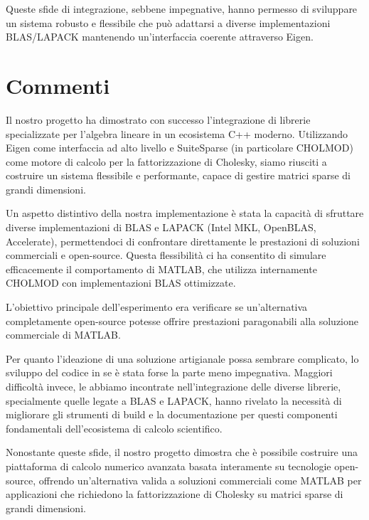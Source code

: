 Queste sfide di integrazione, sebbene impegnative, hanno permesso di sviluppare un sistema robusto e flessibile che può adattarsi a diverse implementazioni BLAS/LAPACK mantenendo un'interfaccia coerente attraverso Eigen.

\section{Commenti}

Il nostro progetto ha dimostrato con successo l'integrazione di librerie specializzate per l'algebra lineare in un ecosistema C++ moderno. 
Utilizzando Eigen come interfaccia ad alto livello e SuiteSparse (in particolare CHOLMOD) come motore di calcolo per la fattorizzazione di 
Cholesky, siamo riusciti a costruire un sistema flessibile e performante, capace di gestire matrici sparse di grandi dimensioni.

Un aspetto distintivo della nostra implementazione è stata la capacità di sfruttare diverse implementazioni di BLAS e LAPACK 
(Intel MKL, OpenBLAS, Accelerate), permettendoci di confrontare direttamente le prestazioni di soluzioni commerciali e open-source. 
Questa flessibilità ci ha consentito di simulare efficacemente il comportamento di MATLAB, che utilizza internamente CHOLMOD con 
implementazioni BLAS ottimizzate.

L'obiettivo principale dell'esperimento era verificare se un'alternativa completamente open-source potesse offrire prestazioni 
paragonabili alla soluzione commerciale di MATLAB.

Per quanto l'ideazione di una soluzione artigianale possa sembrare complicato, lo sviluppo del codice in se è stata forse la parte meno impegnativa.
Maggiori difficoltà invece, le abbiamo incontrate nell'integrazione delle diverse librerie, specialmente quelle legate a BLAS e LAPACK, hanno rivelato 
la necessità di migliorare gli strumenti di build e la documentazione per questi componenti fondamentali dell'ecosistema di 
calcolo scientifico.

Nonostante queste sfide, il nostro progetto dimostra che è possibile costruire una piattaforma di calcolo 
numerico avanzata basata interamente su tecnologie open-source, offrendo un'alternativa valida a soluzioni commerciali come MATLAB per 
applicazioni che richiedono la fattorizzazione di Cholesky su matrici sparse di grandi dimensioni.
